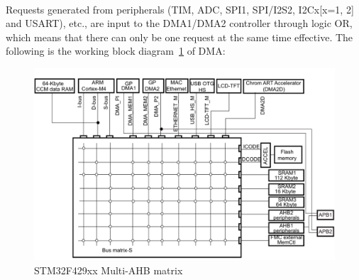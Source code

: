 \\
Requests generated from peripherals (TIM, ADC, SPI1, SPI/I2S2, I2Cx[x=1, 2] and USART), etc., are input to the DMA1/DMA2 controller through logic OR, which means that there can only be one request at the same time effective.
The following is the working block diagram~\ref{fig:2.13}  of DMA:
\begin{figure}[!ht]
	\centering
	\includegraphics[width=13cm]{grafiken/2.13.pdf}
	\caption{STM32F429xx Multi-AHB matrix} 
	\label{fig:2.13}
\end{figure}
\FloatBarrier

